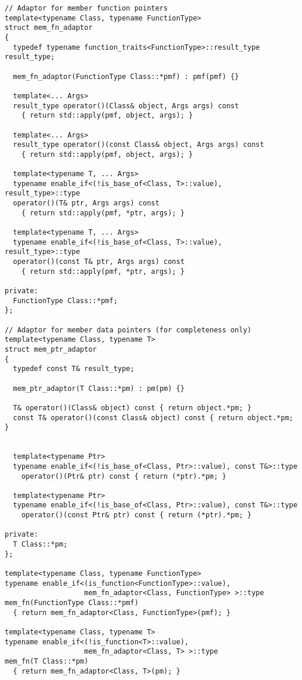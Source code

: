 \documentclass{article}
\begin{document}
\small
\begin{verbatim}
// Adaptor for member function pointers
template<typename Class, typename FunctionType>
struct mem_fn_adaptor
{
  typedef typename function_traits<FunctionType>::result_type result_type;

  mem_fn_adaptor(FunctionType Class::*pmf) : pmf(pmf) {}
  
  template<... Args>
  result_type operator()(Class& object, Args args) const
    { return std::apply(pmf, object, args); }

  template<... Args>
  result_type operator()(const Class& object, Args args) const
    { return std::apply(pmf, object, args); }

  template<typename T, ... Args>
  typename enable_if<(!is_base_of<Class, T>::value), result_type>::type
  operator()(T& ptr, Args args) const
    { return std::apply(pmf, *ptr, args); }

  template<typename T, ... Args>
  typename enable_if<(!is_base_of<Class, T>::value), result_type>::type
  operator()(const T& ptr, Args args) const
    { return std::apply(pmf, *ptr, args); }

private:
  FunctionType Class::*pmf;
};

// Adaptor for member data pointers (for completeness only)
template<typename Class, typename T>
struct mem_ptr_adaptor
{
  typedef const T& result_type;

  mem_ptr_adaptor(T Class::*pm) : pm(pm) {}

  T& operator()(Class& object) const { return object.*pm; }
  const T& operator()(const Class& object) const { return object.*pm; }

  
  template<typename Ptr> 
  typename enable_if<(!is_base_of<Class, Ptr>::value), const T&>::type
    operator()(Ptr& ptr) const { return (*ptr).*pm; }

  template<typename Ptr> 
  typename enable_if<(!is_base_of<Class, Ptr>::value), const T&>::type
    operator()(const Ptr& ptr) const { return (*ptr).*pm; }

private:
  T Class::*pm;
};

template<typename Class, typename FunctionType>
typename enable_if<(is_function<FunctionType>::value), 
                   mem_fn_adaptor<Class, FunctionType> >::type
mem_fn(FunctionType Class::*pmf)
  { return mem_fn_adaptor<Class, FunctionType>(pmf); }

template<typename Class, typename T>
typename enable_if<(!is_function<T>::value), 
                   mem_fn_adaptor<Class, T> >::type
mem_fn(T Class::*pm)
  { return mem_fn_adaptor<Class, T>(pm); }
\end{verbatim}
\normalsize 
\end{document}
